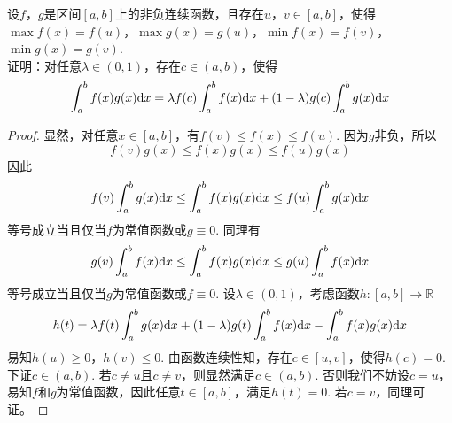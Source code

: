 \begin{theorem}
    
    设$f$，$g$是区间$[a,b]$上的非负连续函数，且存在$u$，$v \in [a,b]$，使得$\max{f(x)} = f(u)$，$\max{g(x)} = g(u)$，$\min{f(x)} = f(v)$，$\min{g(x)} = g(v)$. \\
    证明：对任意$\lambda \in (0,1)$，存在$c \in (a,b)$，使得
    $$\int_{a}^{b}{f(x)g(x)}\mathrm{d} x = \lambda f(c) \int_{a}^{b}{f(x)}\mathrm{d} x + (1 - \lambda)g(c)\int_{a}^{b}{g(x)}\mathrm{d} x$$

\end{theorem}

\begin{proof}

    显然，对任意$x \in [a,b]$，有$f(v) \leq f(x) \leq f(u)$. 因为$g$非负，所以
    $$f(v)g(x) \leq f(x)g(x) \leq f(u)g(x)$$
    因此
    $$f(v) \int_{a}^{b}{g(x)}\mathrm{d} x \leq \int_{a}^{b}{f(x)g(x)}\mathrm{d} x \leq f(u) \int_{a}^{b}{g(x)}\mathrm{d} x$$
    等号成立当且仅当$f$为常值函数或$g \equiv 0$. 同理有
    $$g(v) \int_{a}^{b}{f(x)}\mathrm{d} x \leq \int_{a}^{b}{f(x)g(x)}\mathrm{d} x \leq g(u) \int_{a}^{b}{f(x)}\mathrm{d} x$$
    等号成立当且仅当$g$为常值函数或$f \equiv 0$. 设$\lambda \in (0,1)$，考虑函数$h : [a,b] \to \mathbb{R}$
    $$h(t) = \lambda f(t) \int_{a}^{b}{g(x)}\mathrm{d} x + (1 - \lambda)g(t)\int_{a}^{b}{f(x)}\mathrm{d} x - \int_{a}^{b}{f(x)g(x)}\mathrm{d} x$$
    易知$h(u) \geq 0$，$h(v) \leq 0$. 由函数连续性知，存在$c \in [u,v]$，使得$h(c) = 0$. \\
    下证$c \in (a,b)$. 若$c \neq u$且$c \neq v$，则显然满足$c \in (a,b)$. 
    否则我们不妨设$c = u$，易知$f$和$g$为常值函数，因此任意$t \in [a,b]$，满足$h(t) = 0$. 若$c = v$，同理可证。

\end{proof} 
